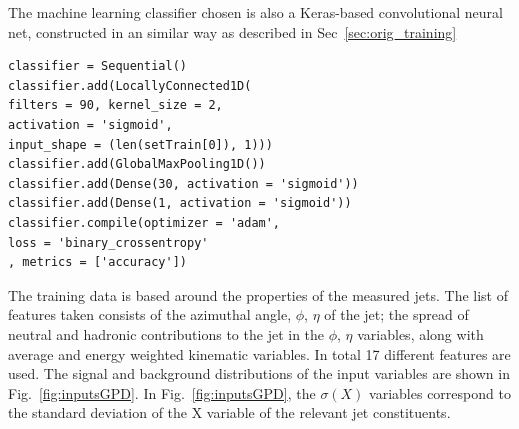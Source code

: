 \documentclass[final,5p,times,twocolumn]{elsarticle}
\begin{document}
The machine learning classifier chosen is also a Keras-based convolutional neural net,
constructed in an similar way as described in Sec~\ref{sec:orig_training}
\begin{lstlisting}
classifier = Sequential()
classifier.add(LocallyConnected1D(
filters = 90, kernel_size = 2,
activation = 'sigmoid',
input_shape = (len(setTrain[0]), 1)))
classifier.add(GlobalMaxPooling1D())
classifier.add(Dense(30, activation = 'sigmoid'))
classifier.add(Dense(1, activation = 'sigmoid'))
classifier.compile(optimizer = 'adam',
loss = 'binary_crossentropy'
, metrics = ['accuracy'])
\end{lstlisting}

The training data is based around the properties of the measured jets. The list of features
taken consists of the azimuthal angle, $\phi$, $\eta$ of the jet; the spread of neutral and 
hadronic contributions to the jet in the $\phi$, $\eta$ variables, along with average and energy weighted
kinematic variables. In total 17 different features are used.
The signal and background distributions of the input variables
are shown in Fig.~\ref{fig:inputsGPD}. In Fig.~\ref{fig:inputsGPD},
the $\sigma(X)$ variables correspond to the standard deviation of the X 
variable of the relevant jet constituents.
%
\end{document}
